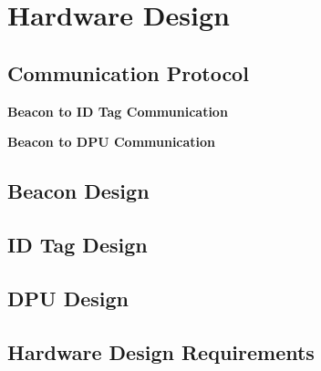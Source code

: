 

\setcounter{section}{3}
\section{Hardware Design}
\bigskip
\subsection{Communication Protocol}

\textbf{Beacon to ID Tag Communication}

\textbf{Beacon to DPU Communication}


\pagebreak
\subsection{Beacon Design}


\pagebreak
\subsection{ID Tag Design}


\pagebreak
\subsection{DPU Design}





\pagebreak
\subsection{Hardware Design Requirements}